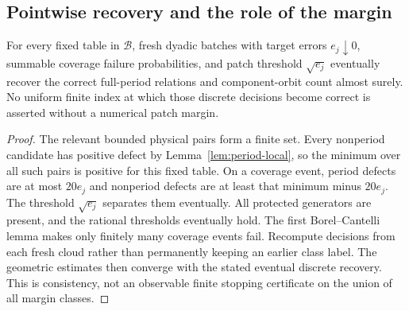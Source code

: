 \subsection{Pointwise recovery and the role of the margin}
\begin{corollary}
\label{cor:repeatpointwise}
For every fixed table in $\mathcal B$, fresh dyadic batches with target
errors $e_j\downarrow0$, summable coverage failure probabilities, and
patch threshold $\sqrt{e_j}$ eventually recover the correct full-period
relations and component-orbit count almost surely. No uniform finite
index at which those discrete decisions become correct is asserted
without a numerical patch margin.
\end{corollary}
\begin{proof}
The relevant bounded physical pairs form a finite set. Every nonperiod
candidate has positive defect by Lemma~\ref{lem:period-local}, so the
minimum over all such pairs is positive for this fixed table. On a
coverage event, period defects are at most $20e_j$ and nonperiod defects
are at least that minimum minus $20e_j$. The threshold $\sqrt{e_j}$
separates them eventually. All protected generators are present, and the
rational thresholds eventually hold. The first Borel--Cantelli lemma
makes only finitely many coverage events fail. Recompute decisions from
each fresh cloud rather than permanently keeping an earlier class label.
The geometric estimates then converge with the stated eventual discrete
recovery. This is consistency, not an observable finite stopping certificate
on the union of all margin classes.
\end{proof}

